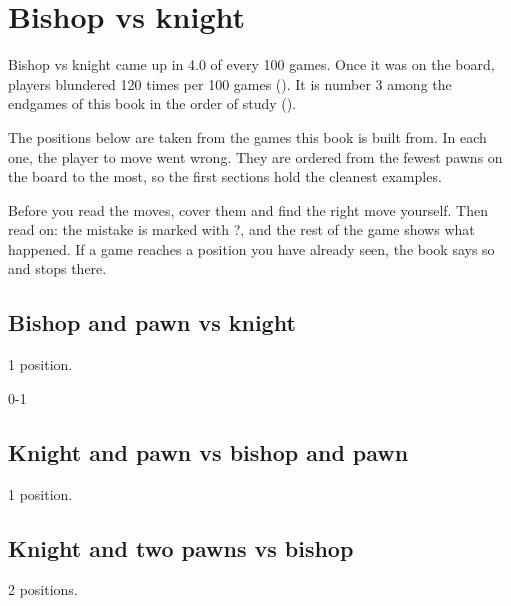 \chapter{Bishop vs knight}\label{ch:bishop-vs-knight}
Bishop vs knight came up in 4.0 of every 100 games. Once it was on the board, players blundered 120 times per 100 games (). It is number 3 among the endgames of this book in the order of study ().

The positions below are taken from the games this book is built from. In each one, the player to move went wrong. They are ordered from the fewest pawns on the board to the most, so the first sections hold the cleanest examples.

Before you read the moves, cover them and find the right move yourself. Then read on: the mistake is marked with ?, and the rest of the game shows what happened. If a game reaches a position you have already seen, the book says so and stops there.


\section{Bishop and pawn vs knight}
1 position.


0-1\par
\section{Knight and pawn vs bishop and pawn}
1 position.


\section{Knight and two pawns vs bishop}
2 positions.

